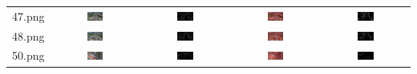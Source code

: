\begin{table}[htbp]
\begin{tabular}{ccccc}
      47.png & \includegraphics[width=0.2\textwidth]{pic/raw/47.png} & \includegraphics[width=0.2\textwidth]{pic/rcf/47.png} & \includegraphics[width=0.2\textwidth]{pic/hqs/500/47.png} & \includegraphics[width=0.2\textwidth]{pic/gt/47.png} \\
      48.png & \includegraphics[width=0.2\textwidth]{pic/raw/48.png} & \includegraphics[width=0.2\textwidth]{pic/rcf/48.png} & \includegraphics[width=0.2\textwidth]{pic/hqs/500/48.png} & \includegraphics[width=0.2\textwidth]{pic/gt/48.png} \\
      50.png & \includegraphics[width=0.2\textwidth]{pic/raw/50.png} & \includegraphics[width=0.2\textwidth]{pic/rcf/50.png} & \includegraphics[width=0.2\textwidth]{pic/hqs/500/50.png} & \includegraphics[width=0.2\textwidth]{pic/gt/50.png} \\

\end{tabular}
\end{table}

